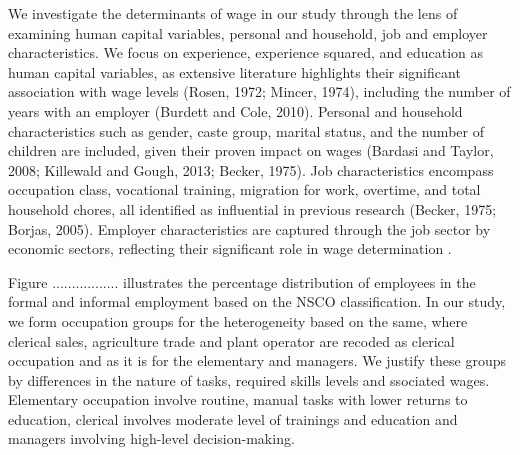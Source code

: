 We investigate the determinants of wage in our study through the lens of examining human capital variables, personal and household, job and employer characteristics. We focus on experience, experience squared, and education as human capital variables, as extensive literature highlights their significant association with wage levels \parencite{Becker1971, Borjas2005} (Rosen, 1972; Mincer, 1974), including the number of years with an employer (Burdett and Cole, 2010). Personal and household characteristics such as gender, caste group, marital status, and the number of children are included, given their proven impact on wages (Bardasi and Taylor, 2008; Killewald and Gough, 2013; Becker, 1975). Job characteristics encompass occupation class, vocational training, migration for work, overtime, and total household chores, all identified as influential in previous research (Becker, 1975; Borjas, 2005). Employer characteristics are captured through the job sector by economic sectors, reflecting their significant role in wage determination \parencite{Becker1971, Borjas2005}.



Figure ................. illustrates the percentage distribution of employees in the formal and informal employment based on the NSCO classification. In our study, we form occupation groups for the heterogeneity based on the same, where clerical sales, agriculture trade and plant operator are recoded as clerical occupation and as it is for the elementary and managers. We justify these groups by differences in the nature of tasks, required skills levels and ssociated wages. Elementary occupation involve routine, manual tasks with lower returns to education, clerical involves moderate level of trainings and education and managers involving high-level decision-making.
 
 
 
 
 
	
 
 
